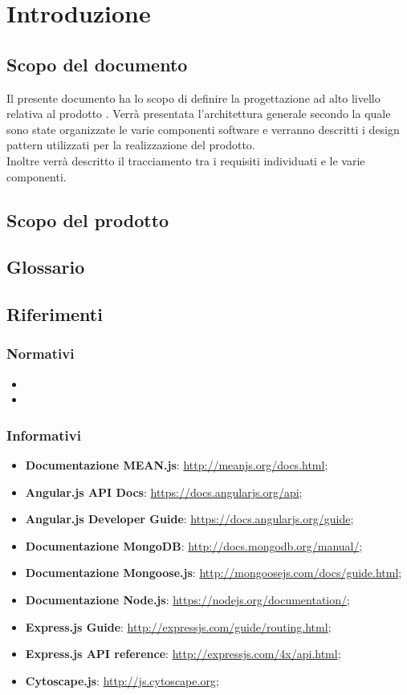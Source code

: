 \section{Introduzione} \label{intro}
\subsection{Scopo del documento}
Il presente documento ha lo scopo di definire la progettazione ad alto livello relativa al prodotto \progetto.
Verrà presentata l'architettura generale secondo la quale sono state organizzate le varie componenti software e verranno descritti i design pattern utilizzati per la realizzazione del prodotto.\\
Inoltre verrà descritto il tracciamento tra i requisiti individuati e le varie componenti.
\subsection{Scopo del prodotto}
\scopoProdotto
\subsection{Glossario}
\descrizioneGlossario
\subsection{Riferimenti}
\subsubsection{Normativi}
\begin{itemize}
\item \normeDiProgetto
\item \analisiDeiRequisiti
\end{itemize}

\subsubsection{Informativi}
\begin{itemize}
\item \textbf{Documentazione MEAN.js}: \url{http://meanjs.org/docs.html};
\item \textbf{Angular.js API Docs}: \url{https://docs.angularjs.org/api};
\item \textbf{Angular.js Developer Guide}: \url{https://docs.angularjs.org/guide};
\item \textbf{Documentazione MongoDB}: \url{http://docs.mongodb.org/manual/};
\item \textbf{Documentazione Mongoose.js}: \url{http://mongoosejs.com/docs/guide.html};
\item \textbf{Documentazione Node.js}: \url{https://nodejs.org/documentation/};
\item \textbf{Express.js Guide}: \url{http://expressjs.com/guide/routing.html};
\item \textbf{Express.js API reference}: \url{http://expressjs.com/4x/api.html};
\item \textbf{Cytoscape.js}: \url{http://js.cytoscape.org};
\end{itemize}